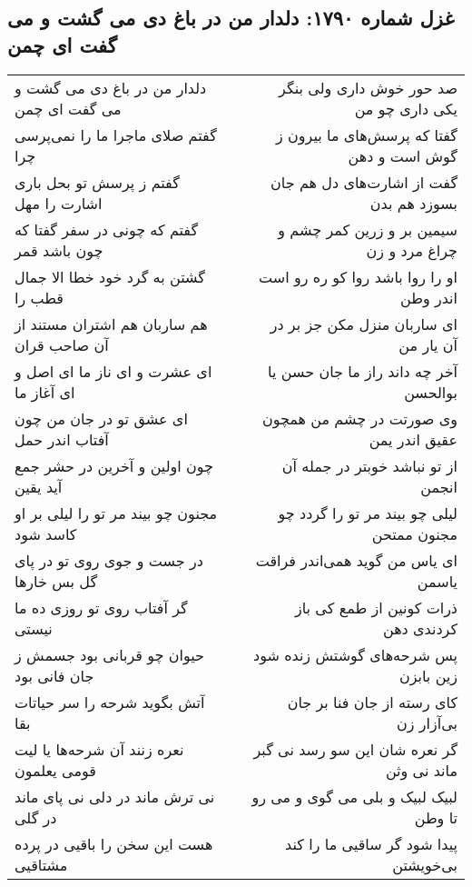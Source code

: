 \begin{center}
\section*{غزل شماره ۱۷۹۰: دلدار من در باغ دی می گشت و می گفت ای چمن}
\label{sec:1790}
\begin{longtable}{l p{0.5cm} r}
دلدار من در باغ دی می گشت و می گفت ای چمن
&&
صد حور خوش داری ولی بنگر یکی داری چو من
\\
گفتم صلای ماجرا ما را نمی‌پرسی چرا
&&
گفتا که پرسش‌های ما بیرون ز گوش است و دهن
\\
گفتم ز پرسش تو بحل باری اشارت را مهل
&&
گفت از اشارت‌های دل هم جان بسوزد هم بدن
\\
گفتم که چونی در سفر گفتا که چون باشد قمر
&&
سیمین بر و زرین کمر چشم و چراغ مرد و زن
\\
گشتن به گرد خود خطا الا جمال قطب را
&&
او را روا باشد روا کو ره رو است اندر وطن
\\
هم ساربان هم اشتران مستند از آن صاحب قران
&&
ای ساربان منزل مکن جز بر در آن یار من
\\
ای عشرت و ای ناز ما ای اصل و ای آغاز ما
&&
آخر چه داند راز ما جان حسن یا بوالحسن
\\
ای عشق تو در جان من چون آفتاب اندر حمل
&&
وی صورتت در چشم من همچون عقیق اندر یمن
\\
چون اولین و آخرین در حشر جمع آید یقین
&&
از تو نباشد خوبتر در جمله آن انجمن
\\
مجنون چو بیند مر تو را لیلی بر او کاسد شود
&&
لیلی چو بیند مر تو را گردد چو مجنون ممتحن
\\
در جست و جوی روی تو در پای گل بس خارها
&&
ای یاس من گوید همی‌اندر فراقت یاسمن
\\
گر آفتاب روی تو روزی ده ما نیستی
&&
ذرات کونین از طمع کی باز کردندی دهن
\\
حیوان چو قربانی بود جسمش ز جان فانی بود
&&
پس شرحه‌های گوشتش زنده شود زین بابزن
\\
آتش بگوید شرحه را سر حیاتات بقا
&&
کای رسته از جان فنا بر جان بی‌آزار زن
\\
نعره زنند آن شرحه‌ها یا لیت قومی یعلمون
&&
گر نعره شان این سو رسد نی گبر ماند نی وثن
\\
نی ترش ماند در دلی نی پای ماند در گلی
&&
لبیک لبیک و بلی می گوی و می رو تا وطن
\\
هست این سخن را باقیی در پرده مشتاقیی
&&
پیدا شود گر ساقیی ما را کند بی‌خویشتن
\\
\end{longtable}
\end{center}
